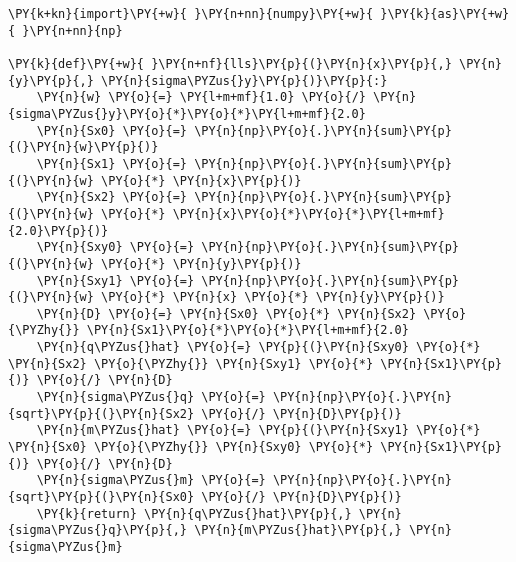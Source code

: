 \begin{Verbatim}[label=\makebox{\href{https://github.com/unipi-physics-labs/statnotes/tree/main/snippy/linear_least_squares.py}{https://github.com/.../linear\_least\_squares.py}},commandchars=\\\{\}]
\PY{k+kn}{import}\PY{+w}{ }\PY{n+nn}{numpy}\PY{+w}{ }\PY{k}{as}\PY{+w}{ }\PY{n+nn}{np}

\PY{k}{def}\PY{+w}{ }\PY{n+nf}{lls}\PY{p}{(}\PY{n}{x}\PY{p}{,} \PY{n}{y}\PY{p}{,} \PY{n}{sigma\PYZus{}y}\PY{p}{)}\PY{p}{:}
    \PY{n}{w} \PY{o}{=} \PY{l+m+mf}{1.0} \PY{o}{/} \PY{n}{sigma\PYZus{}y}\PY{o}{*}\PY{o}{*}\PY{l+m+mf}{2.0}
    \PY{n}{Sx0} \PY{o}{=} \PY{n}{np}\PY{o}{.}\PY{n}{sum}\PY{p}{(}\PY{n}{w}\PY{p}{)}
    \PY{n}{Sx1} \PY{o}{=} \PY{n}{np}\PY{o}{.}\PY{n}{sum}\PY{p}{(}\PY{n}{w} \PY{o}{*} \PY{n}{x}\PY{p}{)}
    \PY{n}{Sx2} \PY{o}{=} \PY{n}{np}\PY{o}{.}\PY{n}{sum}\PY{p}{(}\PY{n}{w} \PY{o}{*} \PY{n}{x}\PY{o}{*}\PY{o}{*}\PY{l+m+mf}{2.0}\PY{p}{)}
    \PY{n}{Sxy0} \PY{o}{=} \PY{n}{np}\PY{o}{.}\PY{n}{sum}\PY{p}{(}\PY{n}{w} \PY{o}{*} \PY{n}{y}\PY{p}{)}
    \PY{n}{Sxy1} \PY{o}{=} \PY{n}{np}\PY{o}{.}\PY{n}{sum}\PY{p}{(}\PY{n}{w} \PY{o}{*} \PY{n}{x} \PY{o}{*} \PY{n}{y}\PY{p}{)}
    \PY{n}{D} \PY{o}{=} \PY{n}{Sx0} \PY{o}{*} \PY{n}{Sx2} \PY{o}{\PYZhy{}} \PY{n}{Sx1}\PY{o}{*}\PY{o}{*}\PY{l+m+mf}{2.0}
    \PY{n}{q\PYZus{}hat} \PY{o}{=} \PY{p}{(}\PY{n}{Sxy0} \PY{o}{*} \PY{n}{Sx2} \PY{o}{\PYZhy{}} \PY{n}{Sxy1} \PY{o}{*} \PY{n}{Sx1}\PY{p}{)} \PY{o}{/} \PY{n}{D}
    \PY{n}{sigma\PYZus{}q} \PY{o}{=} \PY{n}{np}\PY{o}{.}\PY{n}{sqrt}\PY{p}{(}\PY{n}{Sx2} \PY{o}{/} \PY{n}{D}\PY{p}{)}
    \PY{n}{m\PYZus{}hat} \PY{o}{=} \PY{p}{(}\PY{n}{Sxy1} \PY{o}{*} \PY{n}{Sx0} \PY{o}{\PYZhy{}} \PY{n}{Sxy0} \PY{o}{*} \PY{n}{Sx1}\PY{p}{)} \PY{o}{/} \PY{n}{D}
    \PY{n}{sigma\PYZus{}m} \PY{o}{=} \PY{n}{np}\PY{o}{.}\PY{n}{sqrt}\PY{p}{(}\PY{n}{Sx0} \PY{o}{/} \PY{n}{D}\PY{p}{)}
    \PY{k}{return} \PY{n}{q\PYZus{}hat}\PY{p}{,} \PY{n}{sigma\PYZus{}q}\PY{p}{,} \PY{n}{m\PYZus{}hat}\PY{p}{,} \PY{n}{sigma\PYZus{}m}


\end{Verbatim}
